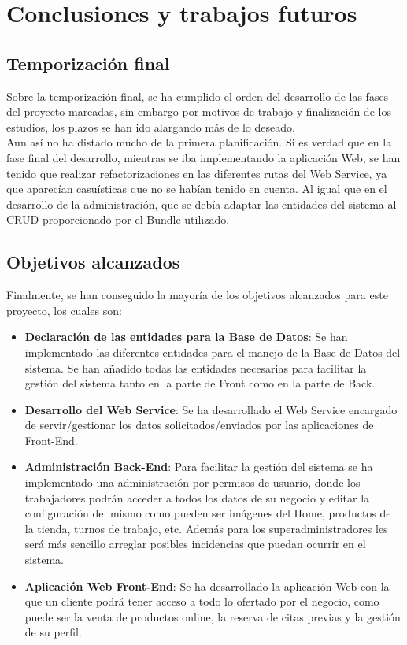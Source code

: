 \chapter{Conclusiones y trabajos futuros}

\section{Temporización final}

Sobre la temporización final, se ha cumplido el orden del desarrollo de las fases del proyecto marcadas, sin embargo por motivos de trabajo y finalización de los estudios, los plazos se han ido alargando más de lo deseado.\\

Aun así no ha distado mucho de la primera planificación. Si es verdad que en la fase final del desarrollo, mientras se iba implementando la aplicación Web, se han tenido que realizar refactorizaciones en las diferentes rutas del Web Service, ya que aparecían casuísticas que no se habían tenido en cuenta. Al igual que en el desarrollo de la administración, que se debía adaptar las entidades del sistema al CRUD proporcionado por el Bundle utilizado.

\section{Objetivos alcanzados}

Finalmente, se han conseguido la mayoría de los objetivos alcanzados para este proyecto, los cuales son:

\begin{itemize}
    \item \textbf{Declaración de las entidades para la Base de Datos}: Se han implementado las diferentes entidades para el manejo de la Base de Datos del sistema. Se han añadido todas las entidades necesarias para facilitar la gestión del sistema tanto en la parte de Front como en la parte de Back.
    \item \textbf{Desarrollo del Web Service}: Se ha desarrollado el Web Service encargado de servir/gestionar los datos solicitados/enviados por las aplicaciones de Front-End.
    \item \textbf{Administración Back-End}: Para facilitar la gestión del sistema se ha implementado una administración por permisos de usuario, donde los trabajadores podrán acceder a todos los datos de su negocio y editar la configuración del mismo como pueden ser imágenes del Home, productos de la tienda, turnos de trabajo, etc. Además para los superadministradores les será más sencillo arreglar posibles incidencias que puedan ocurrir en el sistema.
    \item \textbf{Aplicación Web Front-End}: Se ha desarrollado la aplicación Web con la que un cliente podrá tener acceso a todo lo ofertado por el negocio, como puede ser la venta de productos online, la reserva de citas previas y la gestión de su perfil.
\end{itemize}

